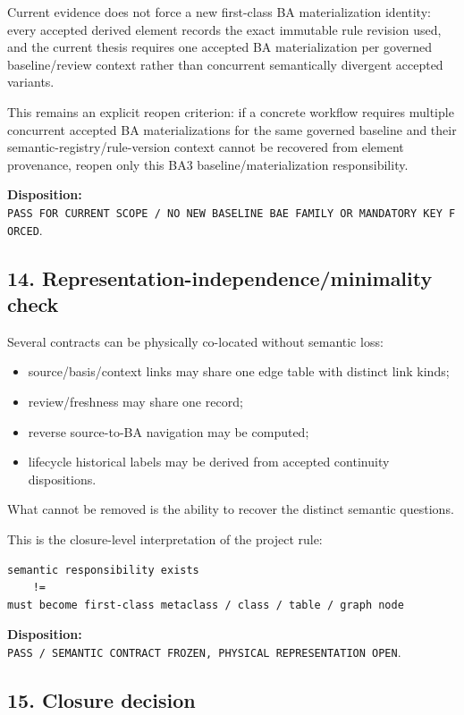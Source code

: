 \documentclass[11pt,a4paper]{article}
\providecommand{\tightlist}{\setlength{\itemsep}{0pt}\setlength{\parskip}{0pt}}
\begin{document}
Current evidence does not force a new first-class BA materialization identity: every accepted derived element records the exact immutable rule revision used, and the current thesis requires one accepted BA materialization per governed baseline/review context rather than concurrent semantically divergent accepted variants.

This remains an explicit reopen criterion: if a concrete workflow requires multiple concurrent accepted BA materializations for the same governed baseline and their semantic-registry/rule-version context cannot be recovered from element provenance, reopen only this BA3 baseline/materialization responsibility.

\textbf{Disposition:} \texttt{PASS\ FOR\ CURRENT\ SCOPE\ /\ NO\ NEW\ BASELINE\ BAE\ FAMILY\ OR\ MANDATORY\ KEY\ FORCED}.

\subsection{14. Representation-independence/minimality check}\label{representation-independenceminimality-check}

Several contracts can be physically co-located without semantic loss:

\begin{itemize}
\tightlist
\item
  source/basis/context links may share one edge table with distinct link kinds;
\item
  review/freshness may share one record;
\item
  reverse source-to-BA navigation may be computed;
\item
  lifecycle historical labels may be derived from accepted continuity dispositions.
\end{itemize}

What cannot be removed is the ability to recover the distinct semantic questions.

This is the closure-level interpretation of the project rule:

\begin{verbatim}
semantic responsibility exists
    !=
must become first-class metaclass / class / table / graph node
\end{verbatim}

\textbf{Disposition:} \texttt{PASS\ /\ SEMANTIC\ CONTRACT\ FROZEN,\ PHYSICAL\ REPRESENTATION\ OPEN}.

\subsection{15. Closure decision}\label{closure-decision}
\end{document}
